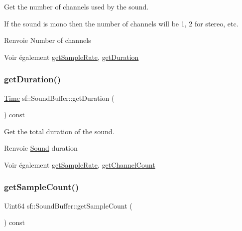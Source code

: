 Get the number of channels used by the sound. 

If the sound is mono then the number of channels will be 1, 2 for stereo, etc.

\begin{DoxyReturn}{Renvoie}
Number of channels
\end{DoxyReturn}
\begin{DoxySeeAlso}{Voir également}
\hyperlink{classsf_1_1SoundBuffer_a2c2cf0078ce0549246ecc4a1646212b4}{get\+Sample\+Rate}, \hyperlink{classsf_1_1SoundBuffer_a280a581d9b360fd16121714c51fc8261}{get\+Duration} 
\end{DoxySeeAlso}
\mbox{\label{classsf_1_1SoundBuffer_a280a581d9b360fd16121714c51fc8261}} 
\subsubsection{\texorpdfstring{get\+Duration()}{getDuration()}}
{\footnotesize\ttfamily \hyperlink{classsf_1_1Time}{Time} sf\+::\+Sound\+Buffer\+::get\+Duration (\begin{DoxyParamCaption}{ }\end{DoxyParamCaption}) const}



Get the total duration of the sound. 

\begin{DoxyReturn}{Renvoie}
\hyperlink{classsf_1_1Sound}{Sound} duration
\end{DoxyReturn}
\begin{DoxySeeAlso}{Voir également}
\hyperlink{classsf_1_1SoundBuffer_a2c2cf0078ce0549246ecc4a1646212b4}{get\+Sample\+Rate}, \hyperlink{classsf_1_1SoundBuffer_a127707b831d875ed790eef1aa2b9fcc3}{get\+Channel\+Count} 
\end{DoxySeeAlso}
\mbox{\label{classsf_1_1SoundBuffer_aebe2a4bdbfbd9249353748da3f6a4fa1}} 
\subsubsection{\texorpdfstring{get\+Sample\+Count()}{getSampleCount()}}
{\footnotesize\ttfamily Uint64 sf\+::\+Sound\+Buffer\+::get\+Sample\+Count (\begin{DoxyParamCaption}{ }\end{DoxyParamCaption}) const}




